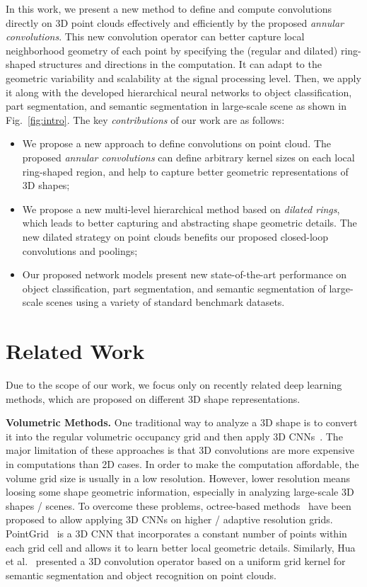 \documentclass[10pt,twocolumn,letterpaper]{article}
\begin{document}
In this work, we present a new method to define and compute convolutions directly on 3D point clouds effectively and efficiently by the proposed \emph{annular convolutions}. This new convolution operator can better capture local neighborhood geometry of each point by specifying the (regular and dilated) ring-shaped structures and directions in the computation. It can adapt to the geometric variability and scalability at the signal processing level. Then, we apply it along with the developed hierarchical neural networks to object classification, part segmentation, and semantic segmentation in large-scale scene as shown in Fig.~\ref{fig:intro}. The key \emph{contributions} of our work are as follows:\vspace{-2mm}
\begin{itemize}
  \item We propose a new approach to define convolutions on point cloud. The proposed \textit{annular convolutions} can define arbitrary kernel sizes on each local ring-shaped region, and help to capture better geometric representations of 3D shapes;\vspace{-2mm}
\item We propose a new multi-level hierarchical method based on \textit{dilated rings}, which leads to better capturing and abstracting shape geometric details. The new dilated strategy on point clouds benefits our proposed closed-loop convolutions and poolings;\vspace{-2mm}
  \item Our proposed network models present new state-of-the-art performance on object classification, part segmentation, and semantic segmentation of large-scale scenes using a variety of standard benchmark datasets.
\end{itemize}

\section{Related Work}
Due to the scope of our work, we focus only on recently related deep learning methods, which are proposed on different 3D shape representations.

\textbf{Volumetric Methods.} One traditional way to analyze a 3D shape is to convert it into the regular volumetric occupancy grid and then apply 3D CNNs~\cite{wu20153d,qi2016volumetric}. The major limitation of these approaches is that 3D convolutions are more expensive in computations than 2D cases. In order to make the computation affordable, the volume grid size is usually in a low resolution. However, lower resolution means loosing some shape geometric information, especially in analyzing large-scale 3D shapes / scenes. To overcome these problems, octree-based methods~\cite{riegler2017octnet,wang2017cnn,Wang-2018-AOCNN} have been proposed to allow applying 3D CNNs on higher / adaptive resolution grids. PointGrid~\cite{le2018pointgrid} is a 3D CNN that incorporates a constant number of points within each grid cell and allows it to learn better local geometric details. Similarly, Hua et al.~\cite{hua2018pointwise} presented a 3D convolution operator based on a uniform grid kernel for semantic segmentation and object recognition on point clouds.
\end{document}

